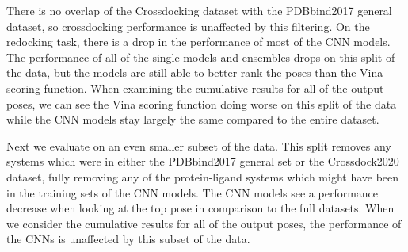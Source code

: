\documentclass[journal=jcisd8,manuscript=article]{achemso}
\begin{document}
There is no overlap of the Crossdocking dataset with the PDBbind2017 general dataset, so crossdocking performance is unaffected by this filtering. On the redocking task, there is a drop in the performance of most of the CNN models. The performance of all of the single models and ensembles drops on this split of the data, but the models are still able to better rank the poses than the Vina scoring function. When examining the cumulative results for all of the output poses, we can see the Vina scoring function doing worse on this split of the data while the CNN models stay largely the same compared to the entire dataset.

Next we evaluate on an even smaller subset of the data. This split removes any systems which were in either the PDBbind2017 general set or the Crossdock2020 dataset, fully removing any of the protein-ligand systems which might have been in the training sets of the CNN models. The CNN models see a performance decrease when looking at the top pose in comparison to the full datasets. When we consider the cumulative results for all of the output poses, the performance of the CNNs is unaffected by this subset of the data.
\end{document}

